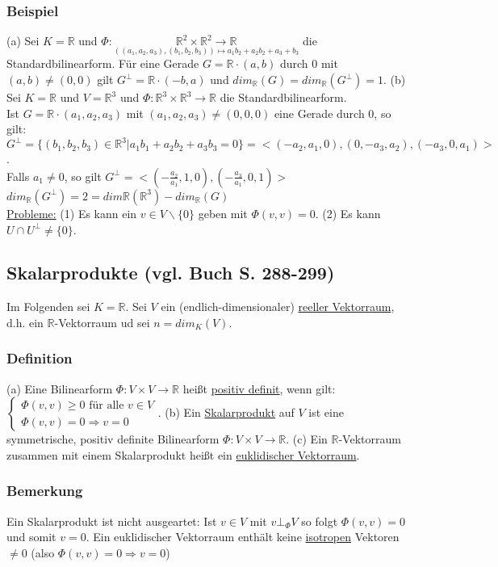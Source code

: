 \documentclass[a4paper]{article}
\newcommand{\ul}{\underline}
\begin{document}
\subsubsection{Beispiel}
(a) Sei \(K=\mathbb{R}\) und \(\Phi:\underset{((a_1,a_2,a_3),(b_1,b_2,b_3))\mapsto a_1b_2+a_2b_2+a_3+b_3}{\mathbb{R}^2\times \mathbb{R}^2\rightarrow \mathbb{R}}\) die Standardbilinearform. Für eine Gerade \(G=\mathbb{R}\cdot (a,b)\) durch 0 mit \((a,b)\neq (0,0)\) gilt \(G^\bot=\mathbb{R}\cdot (-b,a)\) und \(dim_\mathbb{R}(G)=dim_\mathbb{R}(G^\bot)=1\).
(b) Sei \(K=\mathbb{R}\) und \(V=\mathbb{R}^3\) und \(\Phi:\mathbb{R}^3\times\mathbb{R}^3\rightarrow \mathbb{R}\) die Standardbilinearform.\\
Ist \(G=\mathbb{R}\cdot (a_1,a_2,a_3)\) mit \((a_1,a_2,a_3)\neq (0,0,0)\) eine Gerade durch \(0\), so gilt: \(G^\bot=\{(b_1,b_2,b_3)\in\mathbb{R}^3|a_1b_1+a_2b_2+a_3b_3=0\}=<(-a_2,a_1,0),(0,-a_3,a_2),(-a_3,0,a_1)>\).\\
Falls \(a_1\neq0\), so gilt \(G^\bot=<(-\frac{a_2}{a_1},1,0),(-\frac{a_3}{a_1},0,1)>\)\\
\(dim_\mathbb{R}(G^\bot)=2=dim\mathbb{R}(\mathbb{R}^3)-dim_\mathbb{R}(G)\)\\
\ul{Probleme:}
(1) Es kann ein \(v\in V\backslash\{0\}\) geben mit \(\Phi(v,v)=0\).
(2) Es kann \(U\cap U^\bot\neq \{0\}\).
\subsection{Skalarprodukte (vgl. Buch S. 288-299)}
Im Folgenden sei \(K=\mathbb{R}\). Sei \(V\) ein (endlich-dimensionaler) \ul{reeller Vektorraum}, d.h. ein \(\mathbb{R}\)-Vektorraum ud sei \(n=dim_K(V)\).
\subsubsection{Definition}
(a) Eine Bilinearform \(\Phi:V\times V\rightarrow \mathbb{R}\) heißt \ul{positiv definit}, wenn gilt: \(\begin{cases}
\Phi(v,v)\geq 0\text{ für alle }v\in V\\
\Phi(v,v)=0 \Rightarrow v=0
\end{cases}\).
(b) Ein \ul{Skalarprodukt} auf \(V\) ist eine symmetrische, positiv definite Bilinearform \(\Phi:V\times V\rightarrow \mathbb{R}\).
(c) Ein \(\mathbb{R}\)-Vektorraum zusammen mit einem Skalarprodukt heißt ein \ul{euklidischer Vektorraum}.
\subsubsection{Bemerkung}
Ein Skalarprodukt ist nicht ausgeartet: Ist \(v\in V\) mit \(v\bot_\Phi V\) so folgt \(\Phi(v,v)=0\) und somit \(v=0\). Ein euklidischer Vektorraum enthält keine \ul{isotropen} Vektoren \(\neq 0\) (also \(\Phi(v,v)=0\Rightarrow v=0\))
\end{document}
